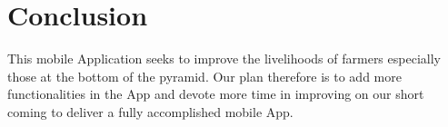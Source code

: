 \chapter{Conclusion}

This mobile Application seeks to improve the livelihoods of farmers especially those at the bottom of the pyramid.
Our plan therefore is to add more functionalities in the App and devote more time in improving on our short coming to deliver a fully accomplished mobile App.
